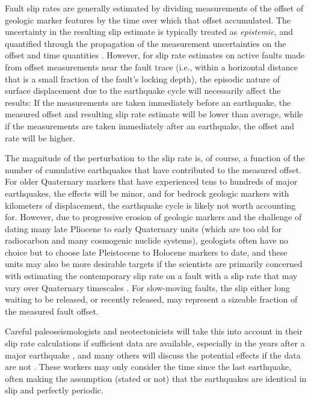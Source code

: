 \documentclass[se, manuscript]{copernicus}
\begin{document}
Fault slip rates are generally estimated by dividing measurements of the
offset of geologic marker features by the time over which that offset
accumulated. The uncertainty in the resulting slip estimate is typically
treated as \emph{epistemic}, and quantified through the propagation of
the measurement uncertainties on the offset and time quantities
\citep[e.g.]{bird_uncertainties_2007,zechar_incorporating_2009}.
However, for slip rate estimates on active faults made from offset
measurements near the fault trace (i.e., within a horizontal distance
that is a small fraction of the fault's locking depth), the episodic
nature of surface displacement due to the earthquake cycle will
necessarily affect the results: If the measurements are taken
immediately before an earthquake, the measured offset and resulting slip
rate estimate will be lower than average, while if the measurements are
taken immediately after an earthquake, the offset and rate will be
higher.

The magnitude of the perturbation to the slip rate is, of course, a
function of the number of cumulative earthquakes that have contributed
to the measured offset. For older Quaternary markers that have
experienced tens to hundreds of major earthquakes, the effects will be
minor, and for bedrock geologic markers with kilometers of displacement,
the earthquake cycle is likely not worth accounting for. However, due to
progressive erosion of geologic markers and the challenge of dating many
late Pliocene to early Quaternary units (which are too old for
radiocarbon and many cosmogenic nuclide systems), geologists often have
no choice but to choose late Pleistocene to Holocene markers to date,
and these units may also be more desirable targets if the scientists are
primarily concerned with estimating the contemporary slip rate on a
fault with a slip rate that may vary over Quaternary timescales
\citep[e.g.]{rittase_temporal_2014,zinke_highly_2018}. For slow-moving
faults, the slip either long waiting to be released, or recently
released, may represent a sizeable fraction of the measured fault
offset.

Careful paleoseismologists and neotectonicists will take this into
account in their slip rate calculations if sufficient data are
available, especially in the years after a major earthquake
\citep[e.g.]{rizza_earthquake_2015}, and many others will discuss the
potential effects if the data are not \citep[e.g.]{lifton_latest_2015}.
These workers may only consider the time since the last earthquake,
often making the assumption (stated or not) that the earthquakes are
identical in slip and perfectly periodic.
\end{document}
